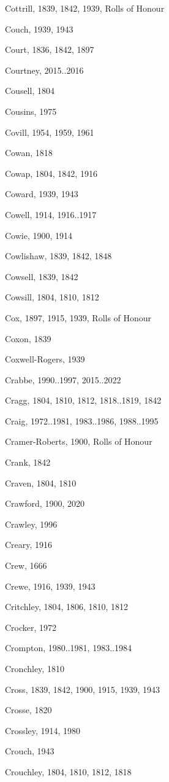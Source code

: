 \begin{theindex}
\item Cottrill, 1839, 1842, 1939, Rolls of Honour
\item Couch, 1939, 1943
\item Court, 1836, 1842, 1897
\item Courtney, 2015..2016
\item Cousell, 1804
\item Cousins, 1975
\item Covill, 1954, 1959, 1961
\item Cowan, 1818
\item Cowap, 1804, 1842, 1916
\item Coward, 1939, 1943
\item Cowell, 1914, 1916..1917
\item Cowie, 1900, 1914
\item Cowlishaw, 1839, 1842, 1848
\item Cowsell, 1839, 1842
\item Cowsill, 1804, 1810, 1812
\item Cox, 1897, 1915, 1939, Rolls of Honour
\item Coxon, 1839
\item Coxwell-Rogers, 1939
\item Crabbe, 1990..1997, 2015..2022
\item Cragg, 1804, 1810, 1812, 1818..1819, 1842
\item Craig, 1972..1981, 1983..1986, 1988..1995
\item Cramer-Roberts, 1900, Rolls of Honour
\item Crank, 1842
\item Craven, 1804, 1810
\item Crawford, 1900, 2020
\item Crawley, 1996
\item Creary, 1916
\item Crew, 1666
\item Crewe, 1916, 1939, 1943
\item Critchley, 1804, 1806, 1810, 1812
\item Crocker, 1972
\item Crompton, 1980..1981, 1983..1984
\item Cronchley, 1810
\item Cross, 1839, 1842, 1900, 1915, 1939, 1943
\item Crosse, 1820
\item Crossley, 1914, 1980
\item Crouch, 1943
\item Crouchley, 1804, 1810, 1812, 1818

\end{theindex}
